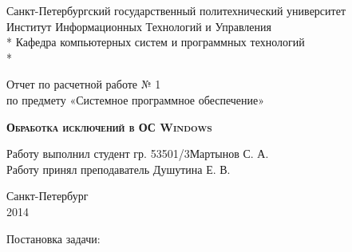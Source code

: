 \documentclass[a4paper,12pt]{article} %
\begin{document}
\begin{titlepage}
\newpage

\begin{center}
Санкт-Петербургский государственный политехнический университет \\
Институт Информационных Технологий и Управления \\*
Кафедра компьютерных систем и программных технологий \\*
\hrulefill
\end{center}

\vspace{18em}

\begin{center}
\Large Отчет по расчетной работе № 1 \\ по предмету «Системное программное обеспечение» \\
\end{center}

\vspace{1em}

\begin{center}
\textsc{\textbf{Обработка исключений в ОС Windows}}
\end{center}

\vspace{16em}

\begin{flushleft}
Работу выполнил студент гр. 53501/3\hrulefill Мартынов С. А. \\
\vspace{1.5em}
Работу принял преподаватель \hrulefill Душутина Е. В. \\
\end{flushleft}

\vspace{\fill}

\begin{center}
Санкт-Петербург \\
2014
\end{center}

\end{titlepage}
\newpage

Постановка задачи:
\end{document}
